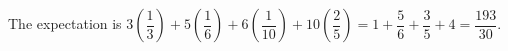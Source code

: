 The expectation is $3(\dfrac{1}{3})+5(\dfrac{1}{6})+6(\dfrac{1}{10})+10(\dfrac{2}{5})=1+\dfrac{5}{6}+\dfrac{3}{5}+4=\boxed{\dfrac{193}{30}}$.
